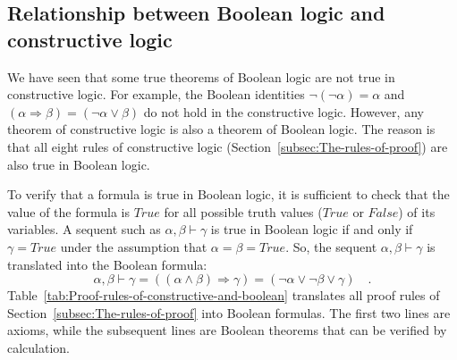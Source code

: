 \subsection{Relationship between Boolean logic and constructive logic\label{subsec:Relationship-between-Boolean} }

We have seen that some true theorems of Boolean logic are not true
in constructive logic. For example, the Boolean identities $\neg\left(\neg\alpha\right)=\alpha$
and $\left(\alpha\Rightarrow\beta\right)=(\neg\alpha\vee\beta)$ do
not hold in the constructive logic. However, any theorem of constructive
logic is also a theorem of Boolean logic. The reason is that all eight
rules of constructive logic (Section~\ref{subsec:The-rules-of-proof})
are also true in Boolean logic.

To verify that a formula is true in Boolean logic, it is sufficient
 to check that the value of the formula is $True$ for all possible
truth values ($True$ or $False$) of its variables. A sequent such
as $\alpha,\beta\vdash\gamma$ is true in Boolean logic if and only
if $\gamma=True$ under the assumption that $\alpha=\beta=True$.
So, the sequent $\alpha,\beta\vdash\gamma$ is translated into the
Boolean formula:
\[
\alpha,\beta\vdash\gamma=\left(\left(\alpha\wedge\beta\right)\Rightarrow\gamma\right)=\left(\neg\alpha\vee\neg\beta\vee\gamma\right)\quad.
\]
Table~\ref{tab:Proof-rules-of-constructive-and-boolean} translates
all proof rules of Section~\ref{subsec:The-rules-of-proof} into
Boolean formulas. The first two lines are axioms, while the subsequent
lines are Boolean theorems that can be verified by calculation.

